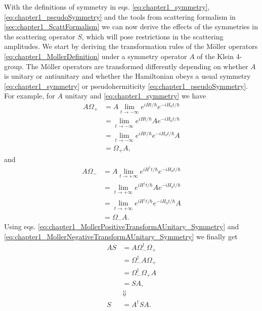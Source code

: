 With the definitions of symmetry in eqs. \eqref{eq:chapter1_symmetry}, \eqref{eq:chapter1_pseudoSymmetry} and the tools from scattering formalism in \ref{sec:chapter1_ScattFormalism} we can now derive the effects of the symmetries in the scattering operator $S$, which will pose restrictions in the scattering amplitudes. We start by deriving the transformation rules of the M\"{o}ller operators \eqref{eq:chapter1_MollerDefinition} under a symmetry operator $A$ of the Klein 4-group. The M\"{o}ller operators are transformed differently depending on whether $A$ is unitary or antiunitary and whether the Hamiltonian obeys a usual symmetry \eqref{eq:chapter1_symmetry} or pseudohermiticity \eqref{eq:chapter1_pseudoSymmetry}. For example, for $A$ unitary and \eqref{eq:chapter1_symmetry} we have
%
\begin{equation}
  \begin{split}
    A \Omega_+ &= A \lim_{t \to -\infty} e^{i H t/\hbar}e^{-i H_0 t/\hbar}\\
    &= \lim_{t \to -\infty}e^{i H t/\hbar}Ae^{-i H_0 t/\hbar}\\
    &= \lim_{t \to -\infty} e^{i H t/\hbar}e^{-i H_0 t/\hbar}A\\
    &= \Omega_+ A,
  \end{split}
  \label{eq:chapter1_MollerPositiveTransformAUnitary_Symmetry}
\end{equation}
%
and
%
\begin{equation}
  \begin{split}
    A \Omega_- &= A \lim_{t \to +\infty} e^{i H^\dagger t/\hbar}e^{-i H_0 t/\hbar}\\
    &= \lim_{t \to +\infty}e^{i H^\dagger t/\hbar}Ae^{-i H_0 t/\hbar}\\
    &= \lim_{t \to +\infty} e^{i H^\dagger t/\hbar}e^{-i H_0 t/\hbar}A\\
    &= \Omega_- A.
  \end{split}
  \label{eq:chapter1_MollerNegativeTransformAUnitary_Symmetry}
\end{equation}
%
Using eqs. \eqref{eq:chapter1_MollerPositiveTransformAUnitary_Symmetry} and \eqref{eq:chapter1_MollerNegativeTransformAUnitary_Symmetry} we finally get
%
\begin{equation}
  \begin{split}
    A S &= A \Omega_{-}^\dagger\Omega_{+} \\
    &= \Omega_{-}^\dagger A \Omega_{+} \\
    &= \Omega_{-}^\dagger\Omega_{+} A \\
    &= S A,\\
    &\Downarrow\\
    S &= A^{\dagger}SA.
  \end{split}
  \label{eq:chapter1_Moller-TransformAUnitary_Symmetry}
\end{equation}
